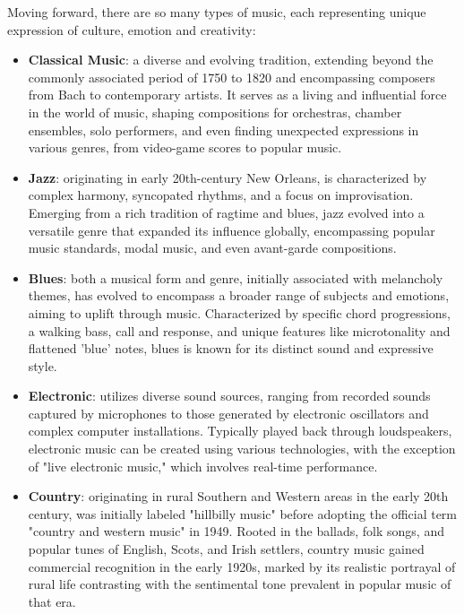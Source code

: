 Moving forward, there are so many types of music, each representing unique expression of culture, emotion and creativity:
\begin{itemize}
    \item \textbf{Classical Music}: a diverse and evolving tradition, extending beyond the commonly associated period of 1750 to 1820 and encompassing composers from Bach to contemporary artists. 
    It serves as a living and influential force in the world of music, shaping compositions for orchestras, chamber ensembles, solo performers, and even finding unexpected expressions in various genres, from video-game scores to popular music. \cite{gabler_2013_what} \nocite{pentreath_2022_why}
    \item \textbf{Jazz}: originating in early 20th-century New Orleans, is characterized by complex harmony, syncopated rhythms, and a focus on improvisation. 
    Emerging from a rich tradition of ragtime and blues, jazz evolved into a versatile genre that expanded its influence globally, encompassing popular music standards, modal music, and even avant-garde compositions.\cite{beek_2021_what}
    \item \textbf{Blues}: both a musical form and genre, initially associated with melancholy themes, has evolved to encompass a broader range of subjects and emotions, aiming to uplift through music.\cite{chaudhuri_2022_what}
    Characterized by specific chord progressions, a walking bass, call and response, and unique features like microtonality and flattened 'blue' notes, blues is known for its distinct sound and expressive style. \cite{bbc_2023_history}
    \item \textbf{Electronic}: utilizes diverse sound sources, ranging from recorded sounds captured by microphones to those generated by electronic oscillators and complex computer installations. 
    Typically played back through loudspeakers, electronic music can be created using various technologies, with the exception of "live electronic music," which involves real-time performance. \cite{hiller_2019_electronic}
    \item \textbf{Country}: originating in rural Southern and Western areas in the early 20th century, was initially labeled "hillbilly music" before adopting the official term "country and western music" in 1949. 
    Rooted in the ballads, folk songs, and popular tunes of English, Scots, and Irish settlers, country music gained commercial recognition in the early 1920s, marked by its realistic portrayal of rural life contrasting with the sentimental tone prevalent in popular music of that era. \cite{_2019_country} \nocite{_2021_country}

\end{itemize}
